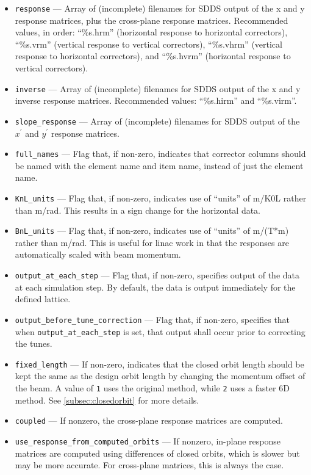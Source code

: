 \documentclass[11pt]{article}
\begin{document}
\begin{itemize}
\item \verb|response| --- Array of (incomplete) filenames for SDDS output of the x and y response
matrices, plus the cross-plane response matrices.  Recommended values, in order: ``\%s.hrm'' (horizontal
response to horizontal correctors), ``\%s.vrm'' (vertical response to vertical correctors),
``\%s.vhrm'' (vertical response to horizontal correctors), and 
``\%s.hvrm'' (horizontal response to vertical correctors).
\item \verb|inverse| --- Array of (incomplete) filenames for SDDS output of the x and y 
inverse response matrices. Recommended values: ``\%s.hirm'' and ``\%s.virm''.
\item \verb|slope_response| --- Array of  (incomplete) filenames for SDDS output of the $x^\prime$ and $y^\prime$ response
matrices.
\item \verb|full_names| --- Flag that, if non-zero, indicates that corrector columns should be named with the element name and
  item name, instead of just the element name.
\item \verb|KnL_units| --- Flag that, if non-zero, indicates use of ``units'' of m/K0L rather than
m/rad.  This results in a sign change for the horizontal data.
\item \verb|BnL_units| --- Flag that, if non-zero, indicates use of ``units'' of m/(T*m) rather than
m/rad.  This is useful for linac work in that the responses are automatically scaled with 
beam momentum.
\item \verb|output_at_each_step| --- Flag that, if non-zero, specifies output of the data at
each simulation step.  By default, the data is output immediately for the defined lattice.
\item \verb|output_before_tune_correction| --- Flag that, if non-zero, specifies that when 
\verb|output_at_each_step| is set, that output shall occur prior to correcting the tunes.
\item \verb|fixed_length| --- If non-zero, indicates that the closed orbit length should be kept the same as the design orbit
  length by changing the momentum offset of the beam. A value of \verb|1| uses the original method, while \verb|2| uses
  a faster 6D method. See \ref{subsec:closedorbit} for more details.
\item \verb|coupled| --- If nonzero, the cross-plane response matrices are computed.
\item \verb|use_response_from_computed_orbits| --- If nonzero, in-plane response matrices are computed
  using differences of closed orbits, which is slower but may be more accurate. For cross-plane matrices, this is always the case.
\end{itemize}
\end{document}
